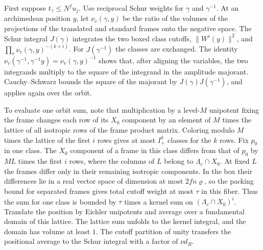 First suppose \(t_\gamma\le N^fu_j\).
Use reciprocal Schur weights for \(\gamma\) and \(\gamma^{-1}\).
At an archimedean position \(y\), let \(\nu_v(\gamma,y)\) be the ratio of
the volumes of the projections of the translated and standard frames
onto the negative space. The Schur integral \(J(\gamma)\) integrates the
two boxed class cutoffs, \(\|W^\flat(y)\|^2\), and
\(\prod_v\nu_v(\gamma,y)^{-(k+i)}\).
For \(J(\gamma^{-1})\) the classes are exchanged.
The identity \(\nu_v(\gamma^{-1},\gamma^{-1}y)=\nu_v(\gamma,y)^{-1}\)
shows that, after aligning the variables, the two integrands multiply
to the square of the integrand in the amplitude majorant.
Cauchy--Schwarz bounds the square of the majorant by
\(J(\gamma)J(\gamma^{-1})\), and applies again over the orbit.

To evaluate one orbit sum, note that multiplication by a level-\(M\)
unipotent fixing the frame changes each row of its \(X_0\) component
by an element of \(M\) times the lattice of all isotropic rows of the
frame product matrix. Coloring modulo \(M\) times the lattice of the
first \(i\) rows gives at most \(I_+^k\) classes for the \(k\) rows.
Fix \(p_0\) in one class. The \(X_0\) component of a frame in this class
differs from that of \(p_0\) by \(ML\) times the first \(i\) rows, where the
columns of \(L\) belong to \(\Lambda_c\cap X_0\).
At fixed \(L\) the frames differ only in their remaining isotropic
components. In the box their differences lie in a real vector space of
dimension at most \(2fn\varrho\), so the packing bound for separated
frames gives total cutoff weight at most \(\tau\) in this fiber.
Thus the sum for one class is bounded by \(\tau\) times a kernel sum on
\((\Lambda_c\cap X_0)^i\).
Translate the position by Eichler unipotents and average over a
fundamental domain of this lattice. The lattice sum unfolds to the
kernel integral, and the domain has volume at least \(1\).
The cutoff partition of unity transfers the positional average to the
Schur integral with a factor of \(\nu d_B\).


